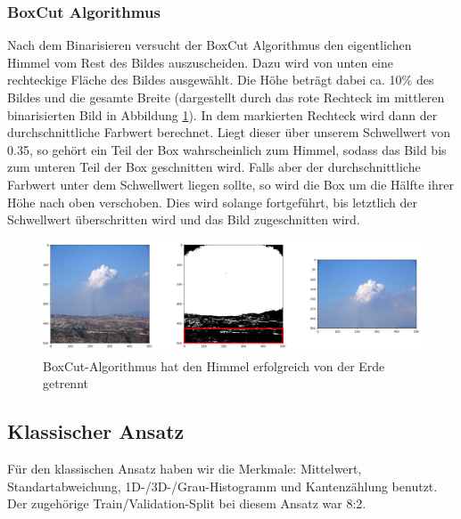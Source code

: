 \documentclass[a4,german]{article}
\begin{document}
\subsubsection{BoxCut Algorithmus}
\label{sec:boxcut}
Nach dem Binarisieren versucht der BoxCut Algorithmus den eigentlichen Himmel vom Rest des Bildes auszuscheiden. Dazu wird von unten eine rechteckige Fläche des Bildes ausgewählt. Die Höhe beträgt dabei ca. 10\%
des Bildes und die gesamte Breite (dargestellt durch das rote Rechteck im mittleren binarisierten Bild in Abbildung \ref{fig:boxAlg}). In dem markierten Rechteck wird dann der durchschnittliche Farbwert berechnet.
Liegt dieser über unserem Schwellwert von 0.35, so gehört ein Teil der Box wahrscheinlich zum Himmel, sodass das Bild bis zum unteren Teil der Box geschnitten wird.
Falls aber der durchschnittliche Farbwert unter dem Schwellwert liegen sollte, so wird die Box um die Hälfte ihrer Höhe nach oben verschoben. Dies wird solange fortgeführt, bis letztlich der Schwellwert überschritten wird und das Bild zugeschnitten wird.


\begin{figure}[h!]
\centering
\includegraphics[width=1.1\textwidth]{boxAlg}
\caption{BoxCut-Algorithmus hat den Himmel erfolgreich von der Erde getrennt}
\label{fig:boxAlg}
\end{figure}


\subsection{Klassischer Ansatz}


Für den klassischen Ansatz haben wir die Merkmale: Mittelwert, Standartabweichung, 1D-/3D-/Grau-Histogramm und Kantenzählung benutzt. 
Der zugehörige Train/Validation-Split bei diesem Ansatz war 8:2.
\end{document}
